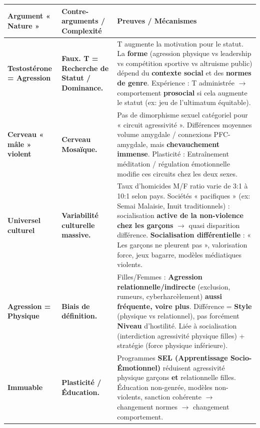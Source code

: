 \documentclass[11pt]{article}
\begin{document}
\begin{exoresolu}
\begin{center}
\begin{tabularx}{\linewidth}{|l|X|X|}\hline
\textbf{Argument « Nature »} & \textbf{Contre-arguments / Complexité} & \textbf{Preuves / Mécanismes} \\ \hline
\textbf{Testostérone = Agression} & \textbf{Faux. T = Recherche de Statut / Dominance.} & T augmente la motivation pour le statut. La \textbf{forme} (agression physique vs leadership vs compétition sportive vs altruisme public) dépend du \textbf{contexte social} et des \textbf{normes de genre}. Expérience : T administrée $\to$ comportement \textbf{prosocial} si cela augmente le statut (ex: jeu de l'ultimatum équitable). \\ \hline
\textbf{Cerveau « mâle » violent} & \textbf{Cerveau Mosaïque.} & Pas de dimorphisme sexuel catégoriel pour « circuit agressivité ». Différences moyennes volume amygdale / connexions PFC-amygdale, mais \textbf{chevauchement immense}. Plasticité : Entraînement méditation / régulation émotionnelle modifie ces circuits chez les deux sexes. \\ \hline
\textbf{Universel culturel} & \textbf{Variabilité culturelle massive.} & Taux d'homicides M/F ratio varie de 3:1 à 10:1 selon pays. Sociétés « pacifiques » (ex: Semai Malaisie, Inuit traditionnels) : socialisation \textbf{active de la non-violence chez les garçons} $\to$ quasi disparition différence. \textbf{Socialisation différentielle} : « Les garçons ne pleurent pas », valorisation force, jeux bagarre, modèles médiatiques violents. \\ \hline
\textbf{Agression = Physique} & \textbf{Biais de définition.} & Filles/Femmes : \textbf{Agression relationnelle/indirecte} (exclusion, rumeurs, cyberharcèlement) \textbf{aussi fréquente, voire plus}. Différence = \textbf{Style} (physique vs relationnel), pas forcément \textbf{Niveau} d'hostilité. Liée à socialisation (interdiction agressivité physique filles) + stratégie (force physique inférieure). \\ \hline
\textbf{Immuable} & \textbf{Plasticité / Éducation.} & Programmes \textbf{SEL (Apprentissage Socio-Émotionnel)} réduisent agressivité physique garçons \textbf{et} relationnelle filles. Éducation non-genrée, modèles non-violents, sanction cohérente $\to$ changement normes $\to$ changement comportement. \\ \hline
\end{tabularx}
\end{center}


\end{exoresolu}
\end{document}
